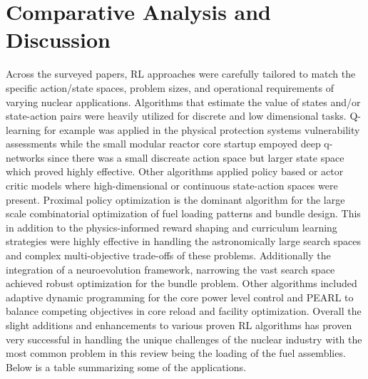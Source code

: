 \documentclass{article}
\begin{document}
\section{Comparative Analysis and Discussion}
Across the surveyed papers, RL approaches were carefully tailored to match the specific action/state spaces, problem sizes, and operational requirements of varying nuclear applications. Algorithms that estimate the value of states and/or state-action pairs were heavily utilized for discrete and low dimensional tasks. Q- learning for example was applied in the physical protection systems vulnerability assessments while the small modular reactor core startup empoyed deep q-networks since there was a small discreate action space but larger state space which proved highly effective. 
\newline
Other algorithms applied policy based or actor critic models where high-dimensional or continuous state-action spaces were present. Proximal policy optimization is the dominant algorithm for the large scale combinatorial optimization of fuel loading patterns and bundle design. This in addition to the physics-informed reward shaping and curriculum learning strategies were highly effective in handling the astronomically large search spaces and complex multi-objective trade-offs of these problems. Additionally the integration of a neuroevolution framework, narrowing the vast search space achieved robust optimization for the bundle problem.
\newline
Other algorithms included adaptive dynamic programming for the core power level control and PEARL to balance competing objectives in core reload and facility optimization. Overall the slight additions and enhancements to various proven RL algorithms has proven very successful in handling the unique challenges of the nuclear industry with the most common problem in this review being the loading of the fuel assemblies. Below is a table summarizing some of the applications. 
\end{document}
